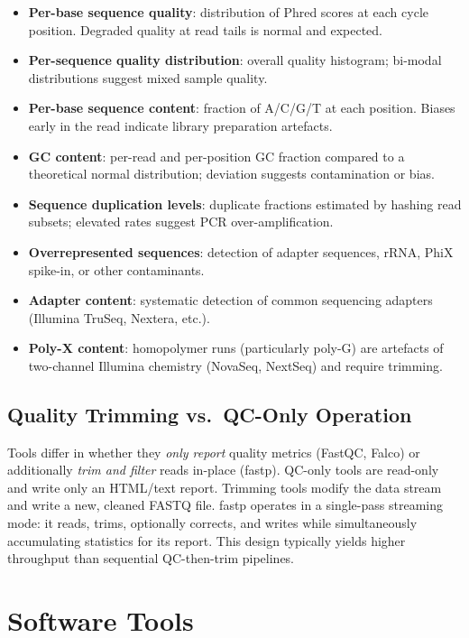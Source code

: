 \documentclass[a4paper,12pt]{article}
\begin{document}
\begin{itemize}
  \item \textbf{Per-base sequence quality}: distribution of Phred scores at
    each cycle position.  Degraded quality at read tails is normal and expected.
  \item \textbf{Per-sequence quality distribution}: overall quality histogram;
    bi-modal distributions suggest mixed sample quality.
  \item \textbf{Per-base sequence content}: fraction of A/C/G/T at each
    position.  Biases early in the read indicate library preparation artefacts.
  \item \textbf{GC content}: per-read and per-position GC fraction compared to
    a theoretical normal distribution; deviation suggests contamination or bias.
  \item \textbf{Sequence duplication levels}: duplicate fractions estimated by
    hashing read subsets; elevated rates suggest PCR over-amplification.
  \item \textbf{Overrepresented sequences}: detection of adapter sequences,
    rRNA, PhiX spike-in, or other contaminants.
  \item \textbf{Adapter content}: systematic detection of common sequencing
    adapters (Illumina TruSeq, Nextera, etc.).
  \item \textbf{Poly-X content}: homopolymer runs (particularly poly-G) are
    artefacts of two-channel Illumina chemistry (NovaSeq, NextSeq) and
    require trimming.
\end{itemize}

\subsection{Quality Trimming vs.\ QC-Only Operation}

Tools differ in whether they \emph{only report} quality metrics (FastQC, Falco)
or additionally \emph{trim and filter} reads in-place (fastp).  QC-only tools
are read-only and write only an HTML/text report.  Trimming tools modify the
data stream and write a new, cleaned FASTQ file.  fastp operates in a
single-pass streaming mode: it reads, trims, optionally corrects, and writes
while simultaneously accumulating statistics for its report.  This design
typically yields higher throughput than sequential QC-then-trim pipelines.

\section{Software Tools}
\label{sec:tools}
\end{document}
